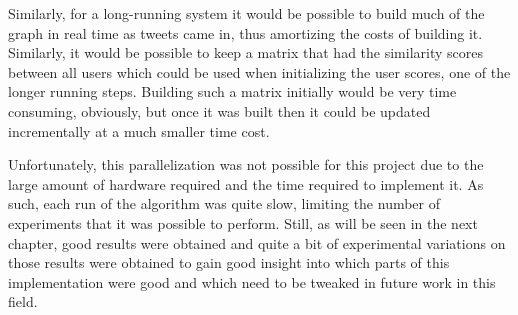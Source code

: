 Similarly, for a long-running system it would be possible to build much of the graph in real time as tweets came in, thus amortizing the costs of building it. Similarly, it would be possible to keep a matrix that had the similarity scores between all users which could be used when initializing the user scores, one of the longer running steps. Building such a matrix initially would be very time consuming, obviously, but once it was built then it could be updated incrementally at a much smaller time cost.

Unfortunately, this parallelization was not possible for this project due to the large amount of hardware required and the time required to implement it. As such, each run of the algorithm was quite slow, limiting the number of experiments that it was possible to perform. Still, as will be seen in the next chapter, good results were obtained and quite a bit of experimental variations on those results were obtained to gain good insight into which parts of this implementation were good and which need to be tweaked in future work in this field.





